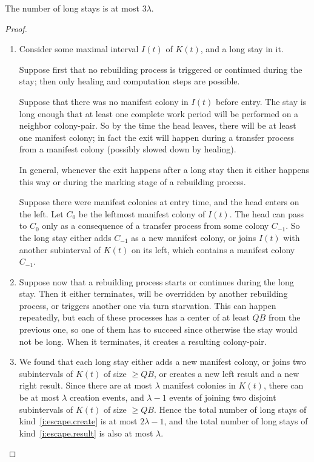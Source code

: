 \documentclass[11pt]{memoir}
\theoremstyle{definition} %
\renewcommand{\ge}{\geq}
\def\B{B}
\newcommand{\Q}{Q} %
\begin{document}
\begin{lemma}\label{lem:escape.long-stays}
  The number of long stays is at most \( 3\lambda \).
\end{lemma}
\begin{proof}
  \begin{enumerate}
  \item\label{i:escape.create}
  Consider some maximal interval \( I(t) \) of \( K(t) \), and a long stay in it.

  Suppose first that no rebuilding process 
  is triggered or continued during the stay; then
  only healing and computation steps are possible.
  
  Suppose that there was no manifest colony in \( I(t) \) before entry.
  The stay is long enough that at least one complete work period will be performed on
  a neighbor colony-pair.
  So by the time the head leaves, there will be at least one manifest colony; in fact the
  exit will happen during a transfer process from a manifest colony (possibly slowed down
  by healing).
  
  In general, whenever the exit happens after a long stay
  then it either happens this way or during the marking stage of
  a rebuilding process.

  Suppose there were manifest colonies at entry time, and the head enters on the left.
  Let \( C_{0} \) be the leftmost manifest colony of \( I(t) \).
  The head can pass to \( C_{0} \) only as a consequence of a
  transfer process from some colony \( C_{-1} \).
  So the long stay either adds \( C_{-1} \) as a new
  manifest colony, or joins \( I(t) \) with another subinterval of \( K(t) \) on its left, which
  contains a manifest colony \( C_{-1} \).
  
\item\label{i:escape.result}
  Suppose now that a rebuilding process starts or continues during the long stay.
  Then it either terminates, will be overridden by another rebuilding process, or
  triggers another one via turn starvation.
  This can happen repeatedly, but
  each of these processes has a center of at least \( \Q\B \) from the previous one, so
  one of them has to succeed since otherwise the stay would not be long.
  When it terminates, it creates a resulting colony-pair.

\item We found that each long stay either adds a new manifest colony, or
  joins two subintervals of \( K(t) \) of size \( \ge\Q\B \), or creates 
  a new left result and a new right result.
  Since there are at most \( \lambda \) manifest colonies in \( K(t) \),
  there can be at most \( \lambda \) creation events, and \( \lambda-1 \) events of
  joining two disjoint subintervals of \( K(t) \) of size \( \ge\Q\B \).
  Hence the total number of long stays of kind~\ref{i:escape.create} is at most \( 2\lambda-1 \),
  and the total number of long stays of kind~\ref{i:escape.result}
  is also at most \( \lambda \).
\end{enumerate}  
\end{proof}
\end{document}
